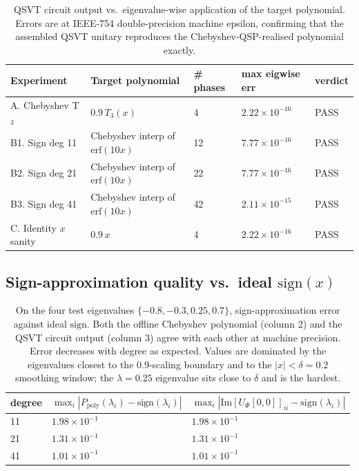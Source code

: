 \documentclass[11pt]{article}
\begin{document}
\begin{table}[h]\centering
\begin{tabular}{lllll}
\toprule
Experiment & Target polynomial & \# phases & max eigwise err & verdict \\
\midrule
A. Chebyshev T$_3$ & $0.9\, T_3(x)$ & 4 & $2.22\times10^{-16}$ & PASS \\
B1. Sign deg 11 & Chebyshev interp of $\mathrm{erf}(10 x)$ & 12 & $7.77\times10^{-16}$ & PASS \\
B2. Sign deg 21 & Chebyshev interp of $\mathrm{erf}(10 x)$ & 22 & $7.77\times10^{-16}$ & PASS \\
B3. Sign deg 41 & Chebyshev interp of $\mathrm{erf}(10 x)$ & 42 & $2.11\times10^{-15}$ & PASS \\
C. Identity $x$ sanity & $0.9\, x$ & 4 & $2.22\times10^{-16}$ & PASS \\
\bottomrule
\end{tabular}
\caption{QSVT circuit output vs.\ eigenvalue-wise application of the
target polynomial. Errors are at IEEE-754 double-precision machine
epsilon, confirming that the assembled QSVT unitary reproduces the
Chebyshev-QSP-realised polynomial exactly.}
\end{table}

\subsection{Sign-approximation quality vs.\ ideal $\mathrm{sign}(x)$}

\begin{table}[h]\centering
\begin{tabular}{lll}
\toprule
degree & $\max_i |P_\mathrm{poly}(\lambda_i) - \mathrm{sign}(\lambda_i)|$ &
         $\max_i |\mathrm{Im}[U_\Phi[0,0]]_{ii} - \mathrm{sign}(\lambda_i)|$ \\
\midrule
11 & $1.98 \times 10^{-1}$ & $1.98 \times 10^{-1}$ \\
21 & $1.31 \times 10^{-1}$ & $1.31 \times 10^{-1}$ \\
41 & $1.01 \times 10^{-1}$ & $1.01 \times 10^{-1}$ \\
\bottomrule
\end{tabular}
\caption{On the four test eigenvalues $\{-0.8,-0.3,0.25,0.7\}$,
sign-approximation error against ideal $\mathrm{sign}$. Both the offline
Chebyshev polynomial (column 2) and the QSVT circuit output (column 3)
agree with each other at machine precision. Error decreases with degree
as expected. Values are dominated by the eigenvalues closest to the
0.9-scaling boundary and to the $|x|<\delta=0.2$ smoothing window; the
$\lambda=0.25$ eigenvalue sits close to $\delta$ and is the hardest.}
\end{table}
\end{document}
